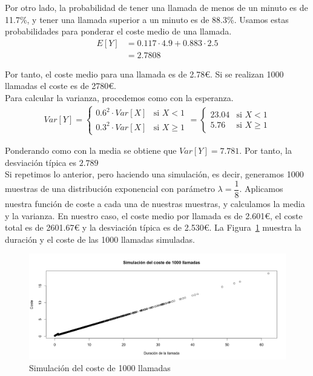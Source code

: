 \documentclass[12pt,a4paper,twoside,openright,titlepage,final]{article}
\begin{document}
Por otro lado, la probabilidad de tener una llamada de menos de un minuto es de 11.7\%, y tener una llamada superior a un minuto es de 88.3\%. Usamos estas probabilidades para ponderar el coste medio de una llamada.\\

\begin{align*}
E[Y] & = 0.117 \cdot 4.9 + 0.883 \cdot 2.5 \\
& = 2.7808
\end{align*}

Por tanto, el coste medio para una llamada es de 2.78€. Si se realizan 1000 llamadas el coste es de 2780€.\\

Para calcular la varianza, procedemos como con la esperanza.\\

\begin{align*}
Var[Y] = \begin{cases}
0.6^2 \cdot Var[X] & \text{si } X < 1 \\
0.3^2 \cdot Var[X] & \text{si } X \geq 1
\end{cases} = \begin{cases}
23.04  & \text{si } X < 1 \\
5.76 & \text{si } X \geq 1
\end{cases}
\end{align*} 

Ponderando como con la media se obtiene que $Var[Y] = 7.781$. Por tanto, la desviación típica es $2.789$\\

Si repetimos lo anterior, pero haciendo una simulación, es decir, generamos 1000 muestras de una distribución exponencial con parámetro $\lambda = \dfrac{1}{8}$. Aplicamos nuestra función de coste a cada una de nuestras muestras, y calculamos la media y la varianza. En nuestro caso, el coste medio por llamada es de 2.601€, el coste total es de 2601.67€ y la desviación típica es de 2.530€. La Figura~\ref{fig:simulacion} muestra la duración y el coste de las 1000 llamadas simuladas.\\

\begin{figure}[tbph!]
\centering
\includegraphics[width=0.9\linewidth]{imagenes/simulacion}
\caption{Simulación del coste de 1000 llamadas}
\label{fig:simulacion}
\end{figure}
\end{document}
